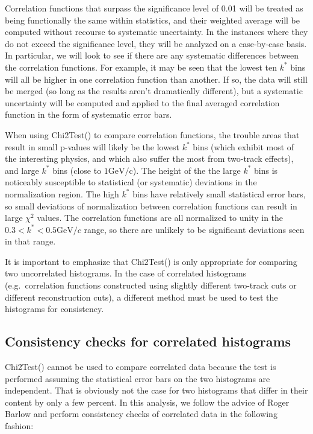 Correlation functions that surpass the significance level of 0.01 will be treated as being functionally the same within statistics, and their weighted average will be computed without recourse to systematic uncertainty. 
In the instances where they do not exceed the significance level, they will be analyzed on a case-by-case basis.  
In particular, we will look to see if there are any systematic differences between the correlation functions.  
For example, it may be seen that the lowest ten $k^*$ bins will all be higher in one correlation function than another.  
If so, the data will still be merged (so long as the results aren't dramatically different), but a systematic uncertainty will be computed and applied to the final averaged correlation function in the form of systematic error bars.  

When using Chi2Test() to compare correlation functions, the trouble areas that result in small p-values will likely be the lowest $k^*$ bins (which exhibit most of the interesting physics, and which also suffer the most from two-track effects), and large $k^*$ bins (close to $1 \mathrm{GeV/c}$).  
The height of the the large $k^*$ bins is noticeably susceptible to statistical (or systematic) deviations in the normalization region.  
The high $k^*$ bins have relatively small statistical error bars, so small deviations of normalization between correlation functions can result in large $\chi^2$ values.  
The correlation functions are all normalized to unity in the $0.3 < k^* < 0.5 \mathrm{GeV}/c$ range, so there are unlikely to be significant deviations seen in that range.  

It is important to emphasize that Chi2Test() is only appropriate for comparing two uncorrelated histograms.  
In the case of correlated histograms (e.g.\ correlation functions constructed using slightly different two-track cuts or different reconstruction cuts), a different method must be used to test the histograms for consistency.  


\subsection{Consistency checks for correlated histograms}
\label{sec:ConsistencyCheckCorrelated}
Chi2Test() cannot be used to compare correlated data because the test is performed assuming the statistical error bars on the two histograms are independent.  
That is obviously not the case for two histograms that differ in their content by only a few percent.  
In this analysis, we follow the advice of Roger Barlow \cite{Barlow:2002yb} and perform consistency checks of correlated data in the following fashion:


